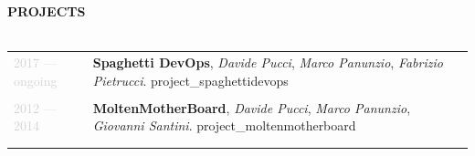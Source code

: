 \documentclass{article}
\begin{document}
\newpage

\textbf{\textcolor{deepblue}{\uppercase{{{projects}}}}} \\\\ \hfill
\begin{tabular}{ R{3cm} L{12cm} }
	\textcolor{lightgray}{2017 — {{ongoing}}} & \textbf{Spaghetti DevOps}, \textit{Davide Pucci}, \textit{Marco Panunzio}, \textit{Fabrizio Pietrucci}. \linebreak
		{{project_spaghettidevops}}  \\\\ \hfill
	\textcolor{lightgray}{2012 — 2014} &
		\textbf{MoltenMotherBoard}, \textit{Davide Pucci}, \textit{Marco Panunzio}, \textit{Giovanni Santini}. \linebreak
		{{project_moltenmotherboard}} \\\\ \hfill
\end{tabular}
\end{document}
